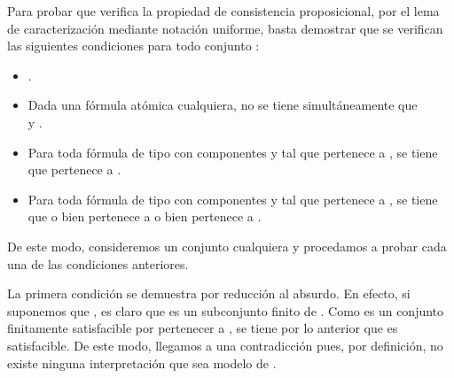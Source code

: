 \begin{isabellebody}
\begin{isamarkuptext}
\begin{demostracion}
    Para probar que  verifica la propiedad de consistencia proposicional, por el lema  de 
    caracterización mediante notación uniforme, basta demostrar que se verifican las siguientes 
    condiciones para todo conjunto :
    \begin{itemize}
     \item {}.
     \item Dada  una fórmula atómica cualquiera, no se tiene 
      simultáneamente que\\  y .
     \item Para toda fórmula de tipo \isa{{\isasymalpha}} con componentes  y  tal que \isa{{\isasymalpha}}
      pertenece a , se tiene que  pertenece a .
     \item Para toda fórmula de tipo \isa{{\isasymbeta}} con componentes  y  tal que \isa{{\isasymbeta}}
      pertenece a , se tiene que o bien  pertenece a  o 
      bien  pertenece a .
    \end{itemize}

    De este modo, consideremos un conjunto cualquiera  y procedamos a probar cada una de las
    condiciones anteriores.

    La primera condición se demuestra por reducción al absurdo. En efecto, si suponemos que 
    , es claro que \isa{{\isacharbraceleft}{\isasymbottom}{\isacharbraceright}} es un subconjunto finito de . Como  es un conjunto
    finitamente satisfacible por pertenecer a , se tiene por lo anterior que \isa{{\isacharbraceleft}{\isasymbottom}{\isacharbraceright}} es 
    satisfacible. De este modo, llegamos a una contradicción pues, por definición, no existe ninguna 
    interpretación que sea modelo de \isa{{\isasymbottom}}.


\end{demostracion}
\end{isamarkuptext}
\end{isabellebody}

